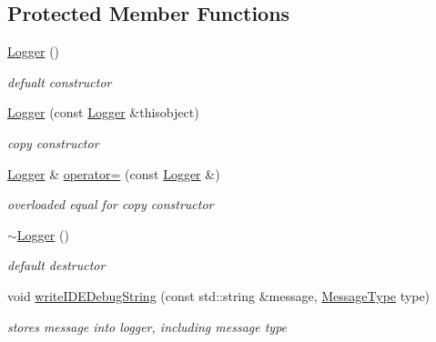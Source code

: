 \subsection*{Protected Member Functions}
\begin{DoxyCompactItemize}
\item 
\hypertarget{class_logger_abc41bfb031d896170c7675fa96a6b30c}{}\hyperlink{class_logger_abc41bfb031d896170c7675fa96a6b30c}{Logger} ()\label{class_logger_abc41bfb031d896170c7675fa96a6b30c}

\begin{DoxyCompactList}\small\item\em defualt constructor \end{DoxyCompactList}\item 
\hypertarget{class_logger_a9bd92adfa65eee945445ca98882deb4f}{}\hyperlink{class_logger_a9bd92adfa65eee945445ca98882deb4f}{Logger} (const \hyperlink{class_logger}{Logger} \&thisobject)\label{class_logger_a9bd92adfa65eee945445ca98882deb4f}

\begin{DoxyCompactList}\small\item\em copy constructor \end{DoxyCompactList}\item 
\hypertarget{class_logger_a643f1fb5e5e4f38efa257f92e8c711a8}{}\hyperlink{class_logger}{Logger} \& \hyperlink{class_logger_a643f1fb5e5e4f38efa257f92e8c711a8}{operator=} (const \hyperlink{class_logger}{Logger} \&)\label{class_logger_a643f1fb5e5e4f38efa257f92e8c711a8}

\begin{DoxyCompactList}\small\item\em overloaded equal for copy constructor \end{DoxyCompactList}\item 
\hypertarget{class_logger_acb668a9e186a25fbaad2e4af6d1ed00a}{}\hyperlink{class_logger_acb668a9e186a25fbaad2e4af6d1ed00a}{$\sim$\+Logger} ()\label{class_logger_acb668a9e186a25fbaad2e4af6d1ed00a}

\begin{DoxyCompactList}\small\item\em default destructor \end{DoxyCompactList}\item 
\hypertarget{class_logger_aa07d60ba7bd279437b853947078e9cfc}{}void \hyperlink{class_logger_aa07d60ba7bd279437b853947078e9cfc}{write\+I\+D\+E\+Debug\+String} (const std\+::string \&message, \hyperlink{class_logger_ad09ea848c6228767e3ad1085da600cd8}{Message\+Type} type)\label{class_logger_aa07d60ba7bd279437b853947078e9cfc}

\begin{DoxyCompactList}\small\item\em stores message into logger, including message type \end{DoxyCompactList}\end{DoxyCompactItemize}
